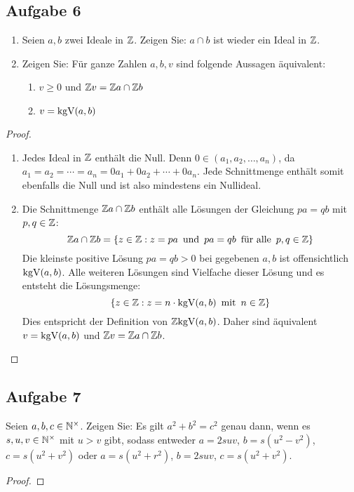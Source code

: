 \subsection{Aufgabe 6}
\begin{enumerate}[label=\alph*)]
  \item Seien $a,b$ zwei Ideale in $\mathbb{Z}{}$. Zeigen Sie:
        $a \cap b$ ist wieder ein Ideal in $\mathbb{Z}{}$.
  \item Zeigen Sie: Für ganze Zahlen $a,b,v$ sind folgende Aussagen äquivalent:
        \begin{enumerate}[label=\roman*)]
          \item $v \geq 0$ und
                $\mathbb{Z}{}v = \mathbb{Z}{}a \cap \mathbb{Z}{}b$
          \item $v = \text{kgV}(a,b)$
        \end{enumerate}
\end{enumerate}
\begin{proof}
  \begin{enumerate}[label=\alph*)]
    \item Jedes Ideal in $\mathbb{Z}{}$ enthält die Null.
          Denn $0 \in (a_1,a_2,\dotsc,a_n)$, da $a_1 = a_2 = \dotsb
            = a_n = 0a_1 + 0 a_2 + \dotsb + 0a_n$.
          Jede Schnittmenge enthält somit ebenfalls die Null
          und ist also mindestens ein Nullideal.
    \item {} Die Schnittmenge $\mathbb{Z}{}a \cap \mathbb{Z}{}b$ enthält
          alle Lösungen der Gleichung $pa = qb$ mit $p,q \in \mathbb{Z}{}$:
          \begin{equation*}
            \mathbb{Z}{}a \cap \mathbb{Z}{}b = \{z \in \mathbb{Z}{}: z = pa \enspace
            \text{und} \enspace pa = qb \enspace
            \text{für alle} \enspace p,q \in \mathbb{Z}{}\}
          \end{equation*}
          Die kleinste positive Lösung $pa = qb > 0$ bei gegebenen $a,b$ ist offensichtlich
          $\text{kgV}(a,b)$. Alle weiteren Lösungen sind Vielfache dieser Lösung
          und es entsteht die Lösungsmenge:
          \begin{equation*}
            \{z \in \mathbb{Z}{}: z = n \cdot \text{kgV}(a,b)
            \enspace \text{mit} \enspace n \in \mathbb{Z}{} \}
          \end{equation*}
          Dies entspricht der Definition von $\mathbb{Z}{}\text{kgV}(a,b)$.
          Daher sind äquivalent
          $v = \text{kgV}(a,b)$ und $\mathbb{Z}{}v = \mathbb{Z}{}a \cap \mathbb{Z}{}b$.
  \end{enumerate}
\end{proof}

\subsection{Aufgabe 7}
Seien $a,b,c \in \mathbb{N}^\times{}$. Zeigen Sie: Es gilt $a^2 + b^2 = c^2$ genau dann,
wenn es $s,u,v \in \mathbb{N}^\times{}$ mit $u > v$ gibt, sodass entweder
$a = 2suv$, $b = s(u^2 - v^2)$, $c = s(u^2 + v^2)$ oder
$a = s(u^2 + r^2)$, $b = 2suv$, $c = s(u^2 + v^2)$.
\begin{proof}
\end{proof}
